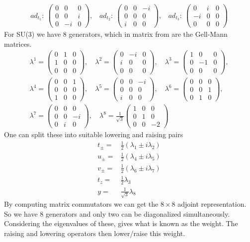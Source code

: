 \documentclass[a4paper,12pt]{article}
\newcommand\matthree[9]{%
	\begin{pmatrix}
		#1 & #2 & #3 \\ #4 & #5 & #6 \\ #7 & #8 & #9
	\end{pmatrix}%
}
\begin{document}
\begin{equation}
	\begin{aligned}
			ad_{t_1}:~\begin{pmatrix}
				0 & 0 & 0\\
				0 & 0 & i\\
				0 & -i & 0
			\end{pmatrix},~~~~
			ad_{t_2}:~\begin{pmatrix}
			0 & 0 & -i\\
			0 & 0 & 0\\
			i & 0 & 0
		\end{pmatrix},~~~~
	ad_{t_3}:~\begin{pmatrix}
	0 & i & 0\\
	-i & 0 & 0\\
	0 & 0 & 0
\end{pmatrix}
	\end{aligned}
\end{equation}
For SU(3) we have 8 generators, which in matrix from are the Gell-Mann matrices.
\begin{gather*}
	\lambda^1 = \matthree {0}{1}{0}{1}{0}{0}{0}{0}{0},\quad
	\lambda^2 = \matthree {0}{-i}{0}{i}{0}{0}{0}{0}{0},\quad
	\lambda^3 = \matthree {1}{0}{0}{0}{-1}{0}{0}{0}{0},\\[1ex]
	\lambda^4 = \matthree {0}{0}{1}{0}{0}{0}{1}{0}{0},\quad
	\lambda^5 = \matthree {0}{0}{-i}{0}{0}{0}{i}{0}{0},\quad
	\lambda^6 = \matthree {0}{0}{0}{0}{0}{1}{0}{1}{0},\\[1ex]
	\lambda^7 = \matthree {0}{0}{0}{0}{0}{-i}{0}{i}{0},\quad
	\lambda^8 = \frac{1}{\sqrt{3}} \matthree {1}{0}{0}{0}{1}{0}{0}{0}{-2}
\end{gather*}
One can split these into suitable lowering and raising pairs
\begin{equation}
	\begin{aligned}
		t_\pm=& \frac{1}{2}(\lambda_1\pm i\lambda_2)\\
		u_\pm=& \frac{1}{2}(\lambda_4\pm i\lambda_5)\\
			v_\pm=& \frac{1}{2}(\lambda_6\pm i\lambda_7)\\
			t_z=&\frac{1}{2}\lambda_3\\
			y=&\frac{1}{\sqrt{3}}\lambda_8
	\end{aligned}
\end{equation}
By computing matrix commutators we can get the $8\times 8$ adjoint representation.
So we have 8 generators and only two can be diagonalized simultaneously. Considering the eigenvalues of these, gives what is known as the weight. The raising and lowering operators then lower/raise this weight.
\newpage
\end{document}
